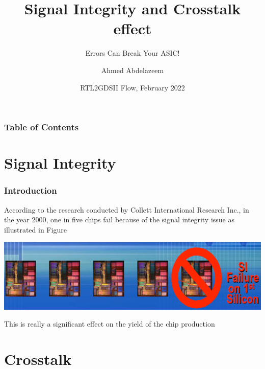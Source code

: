 \documentclass{beamer}
\title[Crosstalk ] %
{Signal Integrity and Crosstalk effect}
\subtitle{Errors Can Break Your ASIC!}
\author[Ahmed Abdelazeem] %
{Ahmed Abdelazeem}
\institute[ZU] %
{
	Faculty of Engineering\\
	Zagazig University
}
\date[ZU 2023] %
{RTL2GDSII Flow, February 2022}
\begin{document}
	
	\frame{\titlepage}
	
	
	\begin{frame}
		\frametitle{Table of Contents}
		\tableofcontents
	\end{frame}
	
	
	\section{Signal Integrity}
	
	\begin{frame}
	\frametitle{Introduction}
	 According to the research conducted by Collett International Research Inc., in the year
	 2000, one in five chips fail because of the signal integrity issue as illustrated in Figure \newline
	 
	 \includegraphics[width=1.0\textwidth]{Signal-Integrity-failures} \newline
	 
	 This is really a significant effect on the yield of the chip production
	\end{frame}

	
	
	\section{Crosstalk}
	
\end{document}
